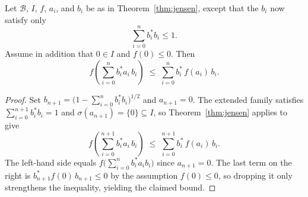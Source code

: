 \begin{theorem}
  \label{thm:jensen_sub}
  \leanok
  Let $\mathcal{B}$, $I$, $f$, $a_i$, and $b_i$ be as in Theorem~\ref{thm:jensen},
  except that the $b_i$ now satisfy only
  \[
    \sum_{i=0}^{n} b_i^* b_i \leq 1.
  \]
  Assume in addition that $0 \in I$ and $f(0) \leq 0$.
  Then
  \[
    f\!\left(\sum_{i=0}^{n} b_i^* a_i\, b_i\right)
    \;\leq\;
    \sum_{i=0}^{n} b_i^*\, f(a_i)\, b_i.
  \]

  \begin{proof}
    \leanok
    Set $b_{n+1} = \bigl(1 - \sum_{i=0}^{n} b_i^* b_i\bigr)^{1/2}$ and $a_{n+1} = 0$.
    The extended family satisfies $\sum_{i=0}^{n+1} b_i^* b_i = 1$ and
    $\sigma(a_{n+1}) = \{0\} \subseteq I$, so Theorem~\ref{thm:jensen} applies to give
    \[
      f\!\left(\sum_{i=0}^{n+1} b_i^* a_i\, b_i\right)
      \;\leq\;
      \sum_{i=0}^{n+1} b_i^*\, f(a_i)\, b_i.
    \]
    The left-hand side equals $f\!\bigl(\sum_{i=0}^{n} b_i^* a_i b_i\bigr)$ since
    $a_{n+1} = 0$.
    The last term on the right is $b_{n+1}^* f(0)\, b_{n+1} \leq 0$ by the assumption
    $f(0) \leq 0$, so dropping it only strengthens the inequality, yielding the
    claimed bound.
  \end{proof}
\end{theorem}
